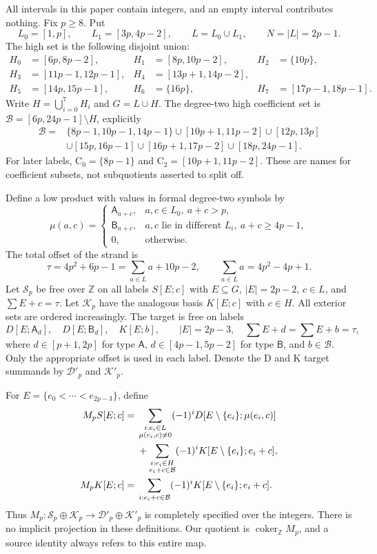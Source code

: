 \documentclass[11pt]{article}
\theoremstyle{definition}
\theoremstyle{remark}
\newcommand{\Z}{\mathbb Z}
\newcommand{\coker}{\operatorname{coker}}
\begin{document}
All intervals in this paper contain integers, and an empty interval contributes
nothing. Fix $p\geq8$. Put
\[
 L_0=[1,p],\qquad L_1=[3p,4p-2],\qquad L=L_0\cup L_1,
 \qquad N=|L|=2p-1.
\]
The high set is the following disjoint union:
\begin{align*}
 H_0&=[6p,8p-2],& H_1&=[8p,10p-2],& H_2&=\{10p\},\\
 H_3&=[11p-1,12p-1],& H_4&=[13p+1,14p-2],\\
 H_5&=[14p,15p-1],& H_6&=\{16p\},& H_7&=[17p-1,18p-1].
\end{align*}
Write $H=\bigcup_{i=0}^7H_i$ and $G=L\cup H$. The degree-two high
coefficient set is $\mathcal B=[6p,24p-1]\setminus H$, explicitly
\begin{align*}
 \mathcal B={}&\{8p-1,10p-1,14p-1\}\cup[10p+1,11p-2]\cup[12p,13p]\\
 &\cup[15p,16p-1]\cup[16p+1,17p-2]\cup[18p,24p-1].
\end{align*}
For later labels, $\mathrm C_0=\{8p-1\}$ and
$\mathrm C_2=[10p+1,11p-2]$. These are names for coefficient subsets,
not subquotients asserted to split off.

Define a low product with values in formal degree-two symbols by
\begin{equation}\label{eq:lowproduct}
 \mu(a,c)=
 \begin{cases}
  \mathsf A_{a+c},&a,c\in L_0,\ a+c>p,\\
  \mathsf B_{a+c},&a,c\text{ lie in different }L_i,\ a+c\geq4p-1,\\
  0,&\text{otherwise}.
 \end{cases}
\end{equation}
The total offset of the strand is
\[
 \tau=4p^2+6p-1=\sum_{a\in L}a+10p-2,
 \qquad \sum_{a\in L}a=4p^2-4p+1.
\]
Let $\mathcal S_p$ be free over $\Z$ on all labels $S[E;c]$ with
$E\subseteq G$, $|E|=2p-2$, $c\in L$, and $\sum E+c=\tau$.
Let $\mathcal K_p$ have the analogous basis $K[E;c]$ with $c\in H$.
All exterior sets are ordered increasingly. The target is free on labels
\[
 D[E;\mathsf A_d],\quad D[E;\mathsf B_d],\quad K[E;b],
 \qquad |E|=2p-3,\quad \sum E+d=\sum E+b=\tau,
\]
where $d\in[p+1,2p]$ for type $\mathsf A$,
$d\in[4p-1,5p-2]$ for type $\mathsf B$, and $b\in\mathcal B$.
Only the appropriate offset is used in each label. Denote the D and K
target summands by $\mathcal D'_p$ and $\mathcal K'_p$.

For $E=\{e_0<\cdots<e_{2p-3}\}$, define
\begin{align}
 M_pS[E;c]={}&
 \sum_{\substack{i:e_i\in L\\\mu(e_i,c)\ne0}}
 (-1)^iD[E\setminus\{e_i\};\mu(e_i,c)]\notag\\
 &+\sum_{\substack{i:e_i\in H\\e_i+c\in\mathcal B}}
 (-1)^iK[E\setminus\{e_i\};e_i+c],\label{eq:MS}\\
 M_pK[E;c]={}&\sum_{\substack{i:e_i+c\in\mathcal B}}
 (-1)^iK[E\setminus\{e_i\};e_i+c].\label{eq:MK}
\end{align}
Thus $M_p:\mathcal S_p\oplus\mathcal K_p\longrightarrow
\mathcal D'_p\oplus\mathcal K'_p$ is completely specified over the integers.
There is no implicit projection in these definitions. Our quotient is
$\coker_{\Z}M_p$, and a source identity always refers to this entire map.
\end{document}
